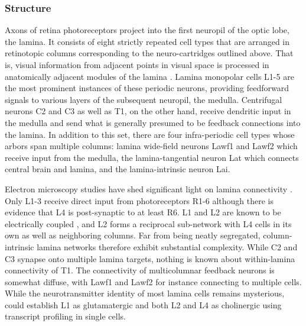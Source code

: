 \subsubsection{Structure}
Axons of retina photoreceptors project into the first neuropil of the optic lobe, the lamina. It consists of eight strictly repeated cell types that are arranged in retinotopic columns corresponding to the neuro-cartridges outlined above. That is, visual information from adjacent points in visual space is processed in anatomically adjacent modules of the lamina \citep{Fischbach:1989uw}. Lamina monopolar cells L1-5 are the most prominent instances of these periodic neurons, providing feedforward signals to various layers of the subsequent neuropil, the medulla. Centrifugal neurons C2 and C3 as well as T1, on the other hand, receive dendritic input in the medulla and send what is generally presumed to be feedback connections into the lamina. In addition to this set, there are four infra-periodic cell types whose arbors span multiple columns: lamina wide-field neurons Lawf1 and Lawf2 which receive input from the medulla, the lamina-tangential neuron Lat which connects central brain and lamina, and the lamina-intrinsic neuron Lai.

Electron microscopy studies have shed significant light on lamina connectivity \citep{Meinertzhagen:1991aa,RiveraAlba:2011dd}. Only L1-3 receive direct input from photoreceptors R1-6 although there is evidence that L4 is post-synaptic to at least R6. L1 and L2 are known to be electrically coupled \citep{Joesch:2010fw}, and L2 forms a reciprocal sub-network with L4 cells in its own as well as neighboring columns. Far from being neatly segregated, column-intrinsic lamina networks therefore exhibit substantial complexity. While C2 and C3 synapse onto multiple lamina targets, nothing is known about within-lamina connectivity of T1. The connectivity of multicolumnar feedback neurons is somewhat diffuse, with Lawf1 and Lawf2 for instance connecting to multiple cells. While the neurotransmitter identity of most lamina cells remains mysterious, \citet{Takemura:2011iy} could establish L1 as glutamatergic and both L2 and L4 as cholinergic using transcript profiling in single cells.

